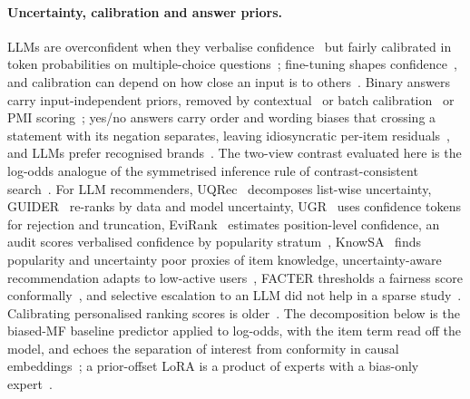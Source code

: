 \paragraph{Uncertainty, calibration and answer priors.}
LLMs are overconfident when they verbalise confidence~\citep{xiong2024llmuncertainty} but fairly calibrated in token probabilities on
multiple-choice questions~\citep{kadavath2022language}; fine-tuning shapes confidence~\citep{kapoor2024taught,li2025conftuner}, and
calibration can depend on how close an input is to others~\citep{xiong2023procal}. Binary answers carry input-independent priors, removed by
contextual~\citep{zhao2021calibrate} or batch calibration~\citep{zhou2024batch} or PMI scoring~\citep{holtzman2021surface}; yes/no answers
carry order and wording biases that crossing a statement with its negation separates, leaving idiosyncratic per-item
residuals~\citep{huang2026yesno}, and LLMs prefer recognised brands~\citep{chu2026incumbent}. The two-view contrast evaluated here is the
log-odds analogue of the symmetrised inference rule of contrast-consistent search~\citep{burns2023ccs}. For LLM recommenders, UQRec~\citep{kweon2025uqrec}
decomposes list-wise uncertainty, GUIDER~\citep{xu2026guider} re-ranks by data and model uncertainty, UGR~\citep{fan2026ugr} uses confidence
tokens for rejection and truncation, EviRank~\citep{yan2026evirank} estimates position-level confidence, an audit scores verbalised
confidence by popularity stratum~\citep{ravikumar2026hallucinating}, KnowSA~\citep{lee2026knowsa} finds popularity and uncertainty poor proxies
of item knowledge, uncertainty-aware recommendation adapts to low-active users~\citep{zou2026uncertainty}, FACTER thresholds a fairness
score conformally~\citep{fayyazi2025facter}, and selective escalation to an LLM did not help in a sparse study~\citep{zhou2026routerec}.
Calibrating personalised ranking scores is older~\citep{kweon2022calibrated}. The decomposition below is the biased-MF baseline predictor
applied to log-odds, with the item term read off the model, and echoes the separation of interest from conformity in causal
embeddings~\citep{zheng2021dice}; a prior-offset LoRA is a product of experts with a bias-only expert~\citep{clark2019easyway}.

